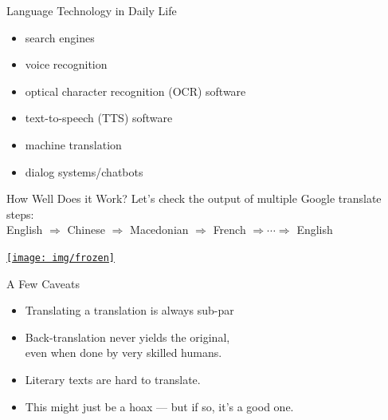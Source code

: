 \documentclass[xcolor={usenames,svgnames,x11names,dvipsnames,table}]{beamer}
\begin{document}
\begin{frame}{Language Technology in Daily Life}
    \begin{itemize}
        \item search engines\\
        \item voice recognition\\
        \item optical character recognition (OCR) software\\
        \item text-to-speech (TTS) software\\
        \item machine translation\\
        \item dialog systems\slash chatbots\\
    \end{itemize}
\end{frame}

\begin{frame}{How Well Does it Work?}
    Let's check the output of multiple Google translate steps:\\
    English $\Rightarrow$ Chinese $\Rightarrow$ Macedonian $\Rightarrow$ French $\Rightarrow \cdots \Rightarrow$ English

    \begin{center}
        \href{run:./frozen_parody.mp4}{
            \texttt{[image: img/frozen]}}
    \end{center}
\end{frame}

\begin{frame}{A Few Caveats}
    \begin{itemize}
        \item Translating a translation is always sub-par\\
        \item Back-translation never yields the original,\\
            even when done by very skilled humans.
        \item Literary texts are hard to translate.
        \item This might just be a hoax --- but if so, it's a good one.
    \end{itemize}
\end{frame}
\end{document}
